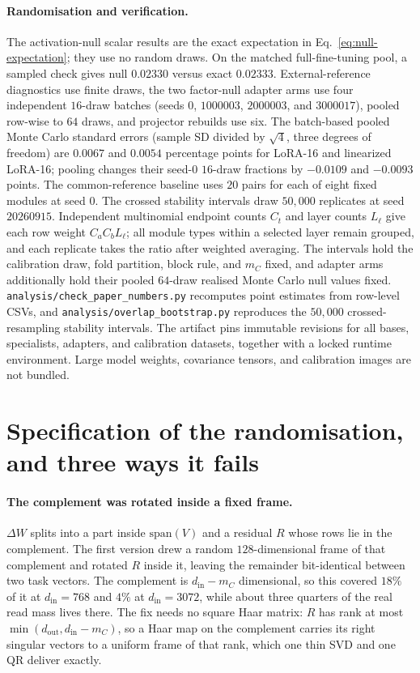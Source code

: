 \paragraph{Randomisation and verification.}
The activation-null scalar results are the exact expectation in Eq.~\ref{eq:null-expectation};
they use no random draws. On the matched full-fine-tuning pool, a sampled check gives null
$0.02330$ versus exact $0.02333$. External-reference diagnostics use finite draws, the two
factor-null adapter arms use four independent $16$-draw batches (seeds $0$, $1000003$,
$2000003$, and $3000017$), pooled row-wise to $64$ draws, and projector rebuilds use six.
The batch-based pooled Monte Carlo standard errors (sample SD divided by $\sqrt 4$, three degrees
of freedom) are $0.0067$ and $0.0054$ percentage points for LoRA-16 and linearized LoRA-16;
pooling changes their seed-$0$ $16$-draw fractions by $-0.0109$ and $-0.0093$ points.
The common-reference baseline uses $20$ pairs for each of eight fixed modules at seed $0$.
The crossed stability intervals draw $50{,}000$ replicates at seed $20260915$. Independent
multinomial endpoint counts $C_t$ and layer counts $L_\ell$ give each row weight $C_aC_bL_\ell$;
all module types within a selected layer remain grouped, and each replicate takes the ratio after
weighted averaging. The intervals hold the calibration draw, fold partition, block rule, and $m_C$
fixed, and adapter arms additionally hold their pooled $64$-draw realised Monte Carlo null values
fixed.
\texttt{analysis/check\_paper\_numbers.py} recomputes point estimates from row-level CSVs, and
\texttt{analysis/overlap\_bootstrap.py} reproduces the $50{,}000$ crossed-resampling stability intervals.
The artifact pins immutable revisions for all bases, specialists, adapters, and calibration
datasets, together with a locked runtime environment. Large model
weights, covariance tensors, and calibration images are not bundled.

\section{Specification of the randomisation, and three ways it fails}
\label{app:defects}

\paragraph{The complement was rotated inside a fixed frame.}
$\Delta W$ splits into a part inside $\mathrm{span}(V)$ and a residual $R$ whose rows lie in the
complement. The first version drew a random $128$-dimensional frame of that complement and
rotated $R$ inside it, leaving the remainder bit-identical between two task vectors. The
complement is $d_{\mathrm{in}} - m_C$ dimensional, so this covered $18\%$ of it at
$d_{\mathrm{in}}=768$ and $4\%$ at $d_{\mathrm{in}}=3072$, while about three quarters of the real
read mass lives there. The fix needs no square Haar matrix: $R$ has rank at most
$\min(d_{\mathrm{out}}, d_{\mathrm{in}}-m_C)$, so a Haar map on the complement carries its right
singular vectors to a uniform frame of that rank, which one thin SVD and one QR deliver exactly.

